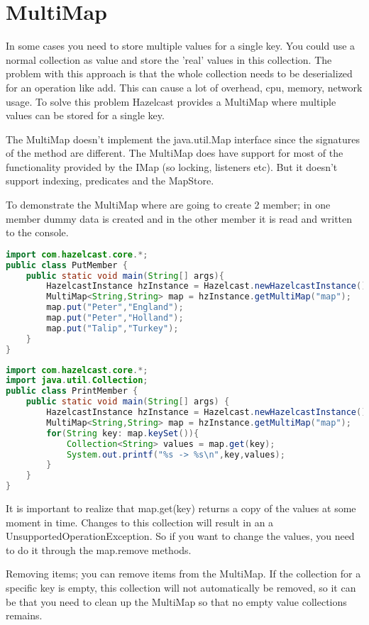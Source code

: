 \section{MultiMap}
In some cases you need to store multiple values for a single key. You could use a normal collection as value and store the 'real' values in this collection. The problem with this approach is that the whole collection needs to be deserialized for an operation like add. This can cause a lot of overhead, cpu, memory, network usage. To solve this problem Hazelcast provides a MultiMap where multiple values can be stored for a single key. 

The MultiMap doesn't implement the java.util.Map interface since the signatures of the method are different. The MultiMap does have support for most of the functionality provided by the IMap (so locking, listeners etc). But it doesn't support indexing, predicates and the MapStore.

To demonstrate the MultiMap where are going to create 2 member; in one member dummy data is created and in the other member it is read and written to the console.
\begin{lstlisting}[language=java]
import com.hazelcast.core.*;
public class PutMember {
    public static void main(String[] args){
        HazelcastInstance hzInstance = Hazelcast.newHazelcastInstance();
        MultiMap<String,String> map = hzInstance.getMultiMap("map");
        map.put("Peter","England");
        map.put("Peter","Holland");
        map.put("Talip","Turkey");
    }
}
\end{lstlisting}

\begin{lstlisting}[language=java]
import com.hazelcast.core.*;
import java.util.Collection;
public class PrintMember {
    public static void main(String[] args) {
        HazelcastInstance hzInstance = Hazelcast.newHazelcastInstance();
        MultiMap<String,String> map = hzInstance.getMultiMap("map");
        for(String key: map.keySet()){
            Collection<String> values = map.get(key);
            System.out.printf("%s -> %s\n",key,values);
        }
    }
}
\end{lstlisting}
It is important to realize that map.get(key) returns a copy of the values at some moment in time. Changes to this collection will result in an a UnsupportedOperationException. So if you want to change the values, you need to do it through the map.remove methods.

Removing items; you can remove items from the MultiMap. If the collection for a specific key is empty, this collection will not automatically be removed, so it can be that you need to clean up the MultiMap so that no empty value collections remains.

